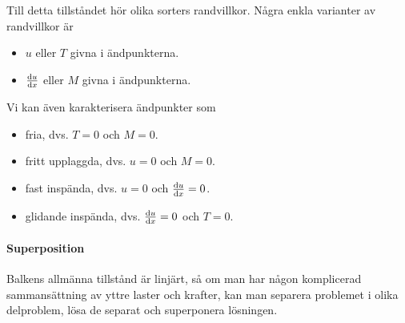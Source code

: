 Till detta tillståndet hör olika sorters randvillkor. Några enkla varianter av randvillkor är
\begin{itemize}
	\item $u$ eller $T$ givna i ändpunkterna.
	\item $\dv{u}{x}$ eller $M$ givna i ändpunkterna.
\end{itemize}
Vi kan även karakterisera ändpunkter som
\begin{itemize}
	\item fria, dvs. $T = 0$ och $M = 0$.
	\item fritt upplaggda, dvs. $u = 0$ och $M = 0$.
	\item fast inspända, dvs. $u = 0$ och $\dv{u}{x} = 0$.
	\item glidande inspända, dvs. $\dv{u}{x} = 0$ och $T = 0$.
\end{itemize}

\paragraph{Superposition}
Balkens allmänna tillstånd är linjärt, så om man har någon komplicerad sammansättning av yttre laster och krafter, kan man separera problemet i olika delproblem, lösa de separat och superponera lösningen.